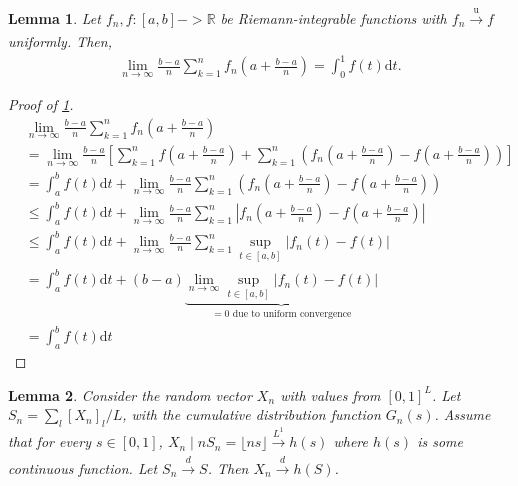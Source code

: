 \documentclass[a4paper]{article}
\newtheorem{lemma}{Lemma}
\newcommand{\dt}{\mathrm{d}t}
\begin{document}
\begin{lemma}
    \label{lemma:integral_convergence}
    Let $f_n, f: [a, b] -> \mathbb{R}$ be Riemann-integrable functions with $f_n \xrightarrow[]{\mathrm{u}} f$ uniformly.
    Then,
    \begin{align*}
        \lim_{n \to \infty} \frac{b-a}{n} \sum_{k=1}^n f_n \left( a + \frac{b-a}{n} \right) = \int_0^1 f(t) \dt.
    \end{align*}
\end{lemma}
\begin{proof}[Proof of \cref{lemma:integral_convergence}]
    \begin{align*}
        &\lim_{n \to \infty} \frac{b-a}{n} \sum_{k=1}^n f_n \left( a + \frac{b-a}{n} \right) \\
        &= \lim_{n \to \infty} \frac{b-a}{n} \left[ \sum_{k=1}^n f \left( a + \frac{b-a}{n} \right) + \sum_{k=1}^n \left( f_n \left( a + \frac{b-a}{n} \right) - f \left( a + \frac{b-a}{n} \right) \right) \right] \\
        &= \int_a^b f(t) \dt + \lim_{n \to \infty} \frac{b-a}{n}\sum_{k=1}^n \left( f_n \left( a + \frac{b-a}{n} \right) - f \left( a + \frac{b-a}{n} \right) \right) \\
        &\leq \int_a^b f(t) \dt + \lim_{n \to \infty} \frac{b-a}{n}\sum_{k=1}^n \left| f_n \left( a + \frac{b-a}{n} \right) - f \left( a + \frac{b-a}{n} \right) \right| \\
        &\leq \int_a^b f(t) \dt + \lim_{n \to \infty} \frac{b-a}{n}\sum_{k=1}^n \sup_{t \in [a, b]} \left| f_n(t) - f(t) \right| \\
        &= \int_a^b f(t) \dt + (b-a) \underbrace{\lim_{n \to \infty} \sup_{t \in [a, b]} \left| f_n(t) - f(t) \right|}_{=0 \text{ due to uniform convergence}} \\
        &= \int_a^b f(t) \dt
    \end{align*}
\end{proof}

\begin{lemma}
    \label{lem:convergence_to_manifold}
    Consider the random vector $X_n$ with values from $[0, 1]^L$.
    Let $S_n = \sum_l[X_n]_l / L$, with the cumulative distribution function $G_n(s)$.
    Assume that for every $s \in [0, 1]$, $X_n \mid n S_n = \lfloor ns \rfloor \xrightarrow[]{L^1} h(s)$ where $h(s)$ is some continuous function.
    Let $S_n \xrightarrow[]{d} S$.
    Then $X_n \xrightarrow[]{d} h(S)$.
\end{lemma}
\end{document}
